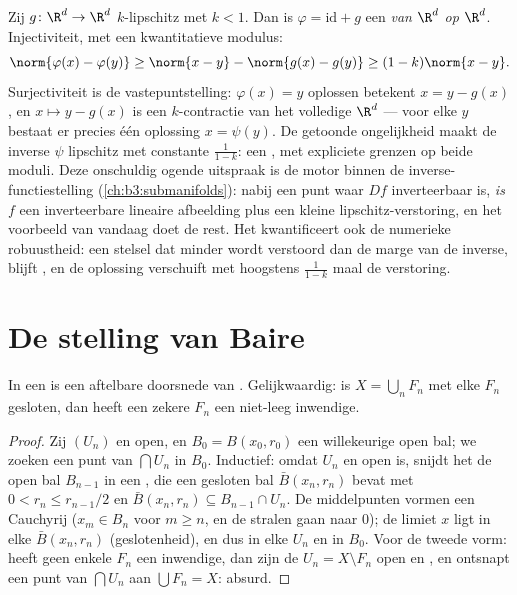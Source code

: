 \begin{example}
\label{ex:b3:complete:perturbident}
Zij $g \colon \R^d \to \R^d$ $k$-lipschitz met $k < 1$. Dan is
$\varphi = \mathrm{id} + g$ een \emph{ van $\R^d$
op $\R^d$}. Injectiviteit, met een kwantitatieve modulus:
\[
\norm{\varphi(x) - \varphi(y)} \geq \norm{x - y} -
\norm{g(x) - g(y)} \geq (1 - k)\norm{x - y} .
\]
Surjectiviteit is de vastepuntstelling: $\varphi(x) = y$
oplossen betekent $x = y - g(x)$, en $x \mapsto y - g(x)$ is
een $k$-contractie van het volledige $\R^d$ --- voor elke $y$
bestaat er precies één oplossing $x = \psi(y)$. De getoonde
ongelijkheid maakt de inverse $\psi$ lipschitz met constante
$\frac1{1-k}$: een , met expliciete grenzen op
beide moduli. Deze onschuldig ogende uitspraak is de motor
binnen de inverse-functiestelling
(\cref{ch:b3:submanifolds}): nabij een punt waar $Df$
inverteerbaar is, \emph{is} $f$ een inverteerbare lineaire
afbeelding plus een kleine lipschitz-verstoring, en het
voorbeeld van vandaag doet de rest. Het kwantificeert ook de
numerieke robuustheid: een stelsel dat minder wordt verstoord
dan de marge van de inverse, blijft , en de oplossing
verschuift met hoogstens $\frac{1}{1-k}$ maal de verstoring.
\end{example}

\section{De stelling van Baire}

\begin{theorem}[Baire]\label{thm:b3:complete:baire}
In een  is een aftelbare doorsnede van
  . Gelijkwaardig: is $X =
\bigcup_{n}F_n$ met elke $F_n$ gesloten, dan heeft een zekere
$F_n$ een niet-leeg inwendige.
\end{theorem}

\begin{proof}
Zij $(U_n)$  en open, en $B_0 = B(x_0, r_0)$ een
willekeurige open bal; we zoeken een punt van $\bigcap U_n$ in
$B_0$. Inductief: omdat $U_{n}$  en open is, snijdt het de
open bal $B_{n-1}$ in een , die een gesloten bal
$\bar B(x_n, r_n)$ bevat met $0 < r_n \leq r_{n-1}/2$ en $\bar
B(x_n, r_n) \subseteq B_{n-1}\cap U_n$. De middelpunten vormen een
Cauchyrij ($x_m \in B_n$ voor $m \geq n$, en de stralen gaan naar
$0$); de limiet $x$ ligt in elke $\bar B(x_n, r_n)$
(geslotenheid), en dus in elke $U_n$ en in $B_0$. Voor de tweede
vorm: heeft geen enkele $F_n$ een inwendige, dan zijn de $U_n = X
\setminus F_n$ open en , en ontsnapt een punt van $\bigcap
U_n$ aan $\bigcup F_n = X$: absurd.
\end{proof}

